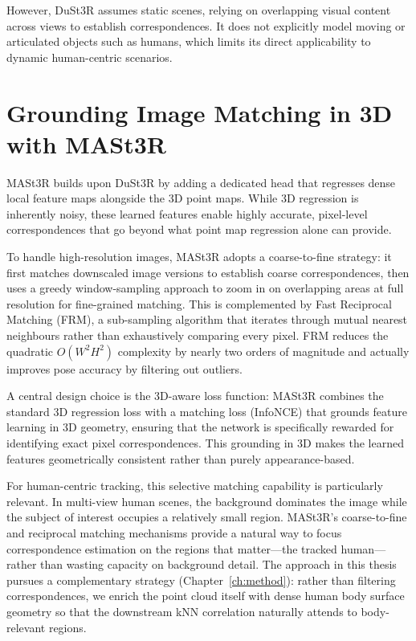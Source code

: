 \documentclass[12pt, a4paper, oneside]{report}
\begin{document}
However, DuSt3R assumes static scenes, relying on overlapping visual content across views to establish correspondences. It does not explicitly model moving or articulated objects such as humans, which limits its direct applicability to dynamic human-centric scenarios.

\section{Grounding Image Matching in 3D with MASt3R}
MASt3R \cite{mast3r_arxiv24} builds upon DuSt3R by adding a dedicated head that regresses dense local feature maps alongside the 3D point maps. While 3D regression is inherently noisy, these learned features enable highly accurate, pixel-level correspondences that go beyond what point map regression alone can provide.

To handle high-resolution images, MASt3R adopts a coarse-to-fine strategy: it first matches downscaled image versions to establish coarse correspondences, then uses a greedy window-sampling approach to zoom in on overlapping areas at full resolution for fine-grained matching. This is complemented by Fast Reciprocal Matching (FRM), a sub-sampling algorithm that iterates through mutual nearest neighbours rather than exhaustively comparing every pixel. FRM reduces the quadratic $O(W^2 H^2)$ complexity by nearly two orders of magnitude and actually improves pose accuracy by filtering out outliers.

A central design choice is the 3D-aware loss function: MASt3R combines the standard 3D regression loss with a matching loss (InfoNCE) that grounds feature learning in 3D geometry, ensuring that the network is specifically rewarded for identifying exact pixel correspondences. This grounding in 3D makes the learned features geometrically consistent rather than purely appearance-based.

For human-centric tracking, this selective matching capability is particularly relevant. In multi-view human scenes, the background dominates the image while the subject of interest occupies a relatively small region. MASt3R's coarse-to-fine and reciprocal matching mechanisms provide a natural way to focus correspondence estimation on the regions that matter---the tracked human---rather than wasting capacity on background detail. The approach in this thesis pursues a complementary strategy (Chapter~\ref{ch:method}): rather than filtering correspondences, we enrich the point cloud itself with dense human body surface geometry so that the downstream kNN correlation naturally attends to body-relevant regions.
\end{document}
